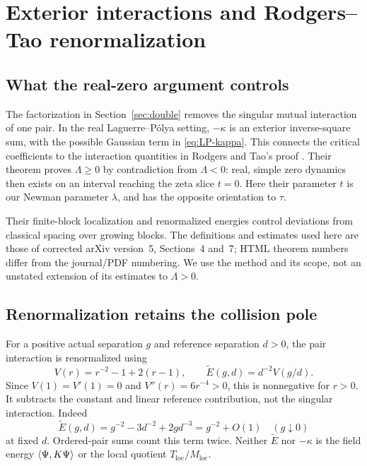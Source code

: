 \section{Exterior interactions and Rodgers--Tao renormalization}
\label{sec:RT}

\subsection{What the real-zero argument controls}
The factorization in Section~\ref{sec:double} removes the singular
mutual interaction of one pair. In the real Laguerre--P\'olya setting,
\(-\kappa\) is an exterior inverse-square sum, with the possible
Gaussian term in \eqref{eq:LP-kappa}. This connects the critical
coefficients to the interaction quantities in Rodgers and Tao's
proof \cite{RodgersTao2020}. Their theorem proves \(\Lambda\ge0\)
by contradiction from \(\Lambda<0\): real, simple zero dynamics
then exists on an interval reaching the zeta slice \(t=0\).
Here their parameter \(t\) is our Newman parameter \(\lambda\),
and has the opposite orientation to \(\tau\).

Their finite-block localization and renormalized energies control
deviations from classical spacing over growing blocks. The
definitions and estimates used here are those of corrected arXiv
version~5, Sections~4 and~7; HTML theorem numbers differ from the
journal/PDF numbering. We use the method and its scope, not an
unstated extension of its estimates to \(\Lambda>0\).

\subsection{Renormalization retains the collision pole}
For a positive actual separation \(g\) and reference separation
\(d>0\), the pair interaction is renormalized using
\begin{equation}\label{eq:RT-renorm}
 V(r)=r^{-2}-1+2(r-1),\qquad
 \widetilde E(g,d)=d^{-2}V(g/d).
\end{equation}
Since \(V(1)=V'(1)=0\) and \(V''(r)=6r^{-4}>0\), this is
nonnegative for \(r>0\). It subtracts the constant and linear
reference contribution, not the singular interaction. Indeed
\begin{equation}\label{eq:RT-pole}
 \widetilde E(g,d)=g^{-2}-3d^{-2}+2g d^{-3}
                =g^{-2}+O(1)\quad(g\downarrow0)
\end{equation}
at fixed \(d\). Ordered-pair sums count this term twice.
Neither \(\widetilde E\) nor \(-\kappa\) is the field energy
\(\left\langle\Psi,K\Psi\right\rangle\) or the local quotient
\(T_{\mathrm{loc}}/M_{\mathrm{loc}}\).

